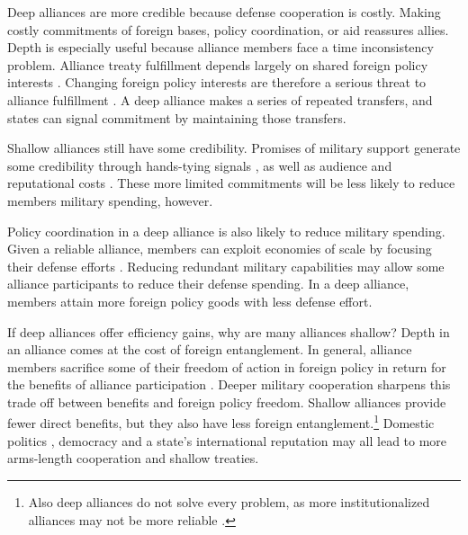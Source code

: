 \documentclass[12pt]{article}
\begin{document}
Deep alliances are more credible because defense cooperation is costly. 
Making costly commitments of foreign bases, policy coordination, or aid reassures allies. 
Depth is especially useful because alliance members face a time inconsistency problem. 
Alliance treaty fulfillment depends largely on shared foreign policy interests \citep{Morrow2000, Leeds2003a}.
Changing foreign policy interests are therefore a serious threat to alliance fulfillment \citep{LeedsSavun2007}. 
A deep alliance makes a series of repeated transfers, and states can signal commitment by maintaining those transfers.  


Shallow alliances still have some credibility. 
Promises of military support generate some credibility through hands-tying signals \citep{Fearon1997}, as well as audience \cite{Morrow2000} and reputational costs \citep{Gibler2008, Crescenzietal2012}.  
These more limited commitments will be less likely to reduce members military spending, however.  


Policy coordination in a deep alliance is also likely to reduce military spending. 
Given a reliable alliance, members can exploit economies of scale by focusing their defense efforts \citep{Leeds2003a}. 
Reducing redundant military capabilities may allow some alliance participants to reduce their defense spending. 
In a deep alliance, members attain more foreign policy goods with less defense effort. 


If deep alliances offer efficiency gains, why are many alliances shallow? 
Depth in an alliance comes at the cost of foreign entanglement. 
In general, alliance members sacrifice some of their freedom of action in foreign policy in return for the benefits of alliance participation \citep{Altfield1984, Snyder1997}.
Deeper military cooperation sharpens this trade off between benefits and foreign policy freedom. 
Shallow alliances provide fewer direct benefits, but they also have less foreign entanglement.\footnote{Also deep alliances do not solve every problem, as more institutionalized alliances may not be more reliable \citep{LeedsAnac2005}.}
Domestic politics \citep{Davis2004}, democracy \citep{Chibaetal2015} and a state's international reputation \citep{Mattes2012} may all lead to more arms-length cooperation and shallow treaties. 
\end{document}
